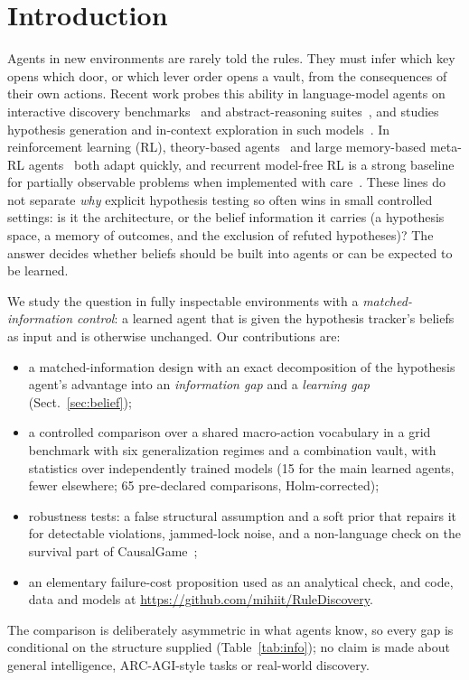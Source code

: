 \documentclass[conference]{IEEEtran}
\begin{document}
\section{Introduction}
Agents in new environments are rarely told the rules. They must infer which key opens which door, or which lever order opens a vault, from the consequences of their own actions. Recent work probes this ability in language-model agents on interactive discovery benchmarks~\cite{jansen2024,gandhi2025,chen2026causalgame} and abstract-reasoning suites~\cite{chollet2025arc2}, and studies hypothesis generation and in-context exploration in such models~\cite{wang2024hs,krishnamurthy2024}. In reinforcement learning (RL), theory-based agents~\cite{tsividis2021} and large memory-based meta-RL agents~\cite{ada2023} both adapt quickly, and recurrent model-free RL is a strong baseline for partially observable problems when implemented with care~\cite{ni2022}. These lines do not separate \emph{why} explicit hypothesis testing so often wins in small controlled settings: is it the architecture, or the belief information it carries (a hypothesis space, a memory of outcomes, and the exclusion of refuted hypotheses)? The answer decides whether beliefs should be built into agents or can be expected to be learned.

We study the question in fully inspectable environments with a \emph{matched-information control}: a learned agent that is given the hypothesis tracker's beliefs as input and is otherwise unchanged. Our contributions are:
\begin{itemize}
\item a matched-information design with an exact decomposition of the hypothesis agent's advantage into an \emph{information gap} and a \emph{learning gap} (Sect.~\ref{sec:belief});
\item a controlled comparison over a shared macro-action vocabulary in a grid benchmark with six generalization regimes and a combination vault, with statistics over independently trained models (15 for the main learned agents, fewer elsewhere; 65 pre-declared comparisons, Holm-corrected);
\item robustness tests: a false structural assumption and a soft prior that repairs it for detectable violations, jammed-lock noise, and a non-language check on the survival part of CausalGame~\cite{chen2026causalgame};
\item an elementary failure-cost proposition used as an analytical check, and code, data and models at \url{https://github.com/mihiit/RuleDiscovery}.
\end{itemize}
The comparison is deliberately asymmetric in what agents know, so every gap is conditional on the structure supplied (Table~\ref{tab:info}); no claim is made about general intelligence, ARC-AGI-style tasks or real-world discovery.
\end{document}
